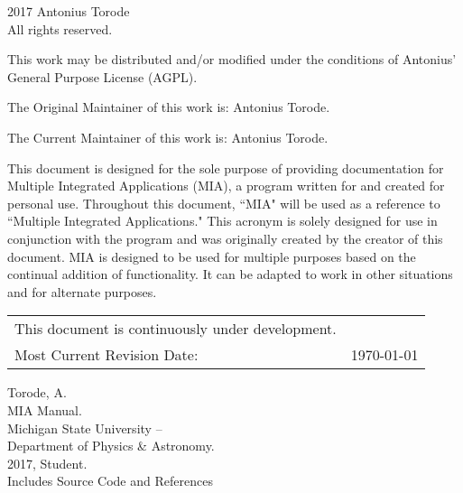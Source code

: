 \pagestyle{empty}
\begingroup
\footnotesize
\parindent 0pt
\parskip \baselineskip
\textcopyright{} 2017 Antonius Torode \\
All rights reserved.

This work may be distributed and/or modified under the conditions of Antonius’ General Purpose License (AGPL).

The Original Maintainer of this work is: Antonius Torode.

The Current Maintainer of this work is: Antonius Torode.

This document is designed for the sole purpose of providing documentation for Multiple Integrated Applications (MIA), a program written for and created for personal use. Throughout this document, ``MIA" will be used as a reference to ``Multiple Integrated Applications." This acronym is solely designed for use in conjunction with the program and was originally created by the creator of this document. MIA is designed to be used for multiple purposes based on the continual addition of functionality. It can be adapted to work in other situations and for alternate purposes.


\begin{center}
\begin{tabular}{ll}
This document is continuously under development. \\
Most Current Revision Date: &  \today 
\end{tabular}
\end{center}

\vfill

Torode, A.\\
\hspace*{1em} MIA Manual. \\
\hspace*{2em} Michigan State University -- \\
\hspace*{2em} Department of Physics \& Astronomy. \\
\hspace*{2em} 2017, Student. \\
\hspace*{2em} Includes Source Code and References \\


\endgroup
\clearpage